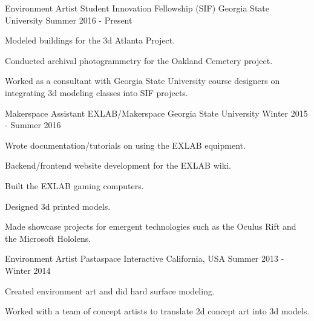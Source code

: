 

\begin{cventries}

  \cventry
    {Environment Artist} %
	{Student Innovation Fellowship (SIF)} %
    {Georgia State University} %
    {Summer 2016 - Present} %
    {
      \begin{cvitems} %
        \item {Modeled buildings for the 3d Atlanta Project.}
        \item {Conducted archival photogrammetry for the Oakland Cemetery project.}
        \item {Worked as a consultant with Georgia State University course designers on integrating 3d modeling classes into SIF projects.}
      \end{cvitems}
    }

  \cventry
    {Makerspace Assistant} %
	{EXLAB/Makerspace} %
    {Georgia State University} %
    {Winter 2015 - Summer 2016} %
    {
      \begin{cvitems} %
        \item {Wrote documentation/tutorials on using the EXLAB equipment.}
        \item {Backend/frontend website development for the EXLAB wiki.}
		\item {Built the EXLAB gaming computers.}
		\item {Designed 3d printed models.}
		\item {Made showcase projects for emergent technologies such as the Oculus Rift and the Microsoft Hololens.}
      \end{cvitems}
    }

  \cventry
	{Environment Artist} %
    {Pastaspace Interactive} %
    {California, USA} %
    {Summer 2013 - Winter 2014} %
    {
      \begin{cvitems} %
        \item {Created environment art and did hard surface modeling.}
        \item {Worked with a team of concept artists to translate 2d concept art into 3d models.}
      \end{cvitems}
    }
\end{cventries}

